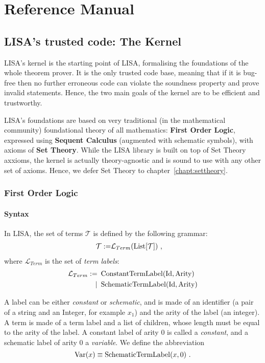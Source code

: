 

\part{Reference Manual}
\label{part:manual}
\chapter{LISA's trusted code: The Kernel}
\label{chapt:kernel}
LISA's kernel is the starting point of LISA, formalising the foundations of the whole theorem prover. It is the only trusted code base, meaning that if it is bug-free then no further erroneous code can violate the soundness property and prove invalid statements. Hence, the two main goals of the kernel are to be efficient and trustworthy. 


LISA's foundations are based on very traditional (in the mathematical community) foundational theory of all mathematics: \textbf{First Order Logic}, expressed using \textbf{Sequent Calculus} (augmented with schematic symbols), with axioms of \textbf{Set Theory}.
While the LISA library is built on top of Set Theory axxioms, the kernel is actually theory-agnostic and is sound to use with any other set of axioms. Hence, we defer Set Theory to chapter~\ref{chapt:settheory}.

\section{First Order Logic}
\label{sect:FOL}
\subsection{Syntax}
\begin{defin}[Terms]
  In LISA, the set of terms $\mathcal{T}$ is defined by the following grammar:
  \begin{align}
    \mathcal{T} := & \mathcal{L}_{Term}(\operatorname{List}[\mathcal{T}])~,
  \end{align}
  where $\mathcal{L}_{Term}$ is the set of \textit{term labels}:
  \begin{align}
    \mathcal{L}_{Term} := & ~\operatorname{ConstantTermLabel}(\textnormal{Id}, \textnormal{Arity})  \\ 
    \mid                  & ~\operatorname{SchematicTermLabel}(\textnormal{Id}, \textnormal{Arity}) 
  \end{align}

  A label can be either \textit{constant} or \textit{schematic}, and is made of an identifier (a pair of a string and an Integer, for example $x_1$) and the arity of the label (an integer).
  A term is made of a term label and a list of children, whose length must be equal to the arity of the label.
  A constant label of arity $0$ is called a \emph{constant}, and a schematic label of arity $0$ a \emph{variable}.
  We define the abbreviation
  $$
    \operatorname{Var}(x) \equiv \operatorname{SchematicTermLabel}(x, 0)~.
  $$
\end{defin}

